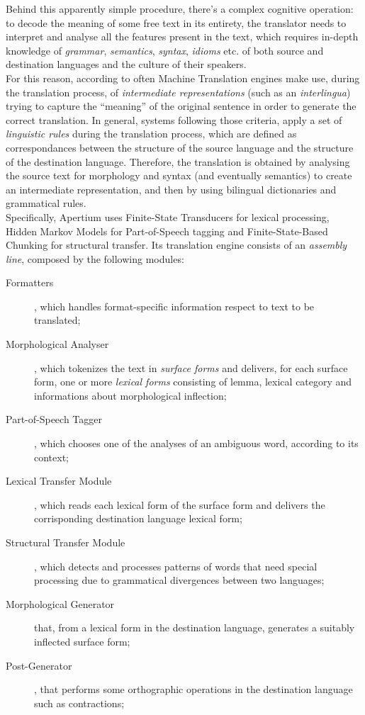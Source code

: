 \documentclass[11pt]{article}
\begin{document}
Behind this apparently simple procedure, there's a complex cognitive operation: to decode the meaning of some free text in its entirety, the translator
needs to interpret and analyse all the features present in the text, which requires in-depth knowledge of \emph{grammar}, \emph{semantics}, \emph{syntax},
\emph{idioms} etc. of both source and destination languages and the culture of their speakers.\\

For this reason, according to \citep{arnoldea} often Machine Translation engines make use, during the translation process, of 
\emph{intermediate representations} (such as an \emph{interlingua}) trying to capture the ``meaning'' of the original sentence in order to generate the 
correct translation. 
In general, systems following those criteria, apply a set of \emph{linguistic rules} during the translation process, which are defined as correspondances 
between the structure of the source language and the structure of the destination language. Therefore, the translation is obtained by analysing the source 
text for morphology and syntax (and eventually semantics) to create an intermediate representation, and then by using bilingual dictionaries and grammatical
rules.\\

Specifically, Apertium uses Finite-State Transducers for lexical processing, Hidden Markov Models for Part-of-Speech tagging and Finite-State-Based Chunking
for structural transfer. Its translation engine consists of an \emph{assembly line}, composed by the following modules: 

\begin{description}
 \item[Formatters], which handles format-specific information respect to text to be translated;
 \item[Morphological Analyser], which tokenizes the text in \emph{surface forms} and delivers, for each surface form, one or more \emph{lexical forms}
  consisting of lemma, lexical category and informations about morphological inflection;
 \item[Part-of-Speech Tagger], which chooses one of the analyses of an ambiguous word, according to its context;
 \item[Lexical Transfer Module], which reads each lexical form of the surface form and delivers the corrisponding destination language lexical form;
 \item[Structural Transfer Module], which detects and processes patterns of words that need special processing due to grammatical divergences between two
  languages;
 \item[Morphological Generator] that, from a lexical form in the destination language, generates a suitably inflected surface form;
 \item[Post-Generator], that performs some orthographic operations in the destination language such as contractions;
\end{description}
\end{document}
